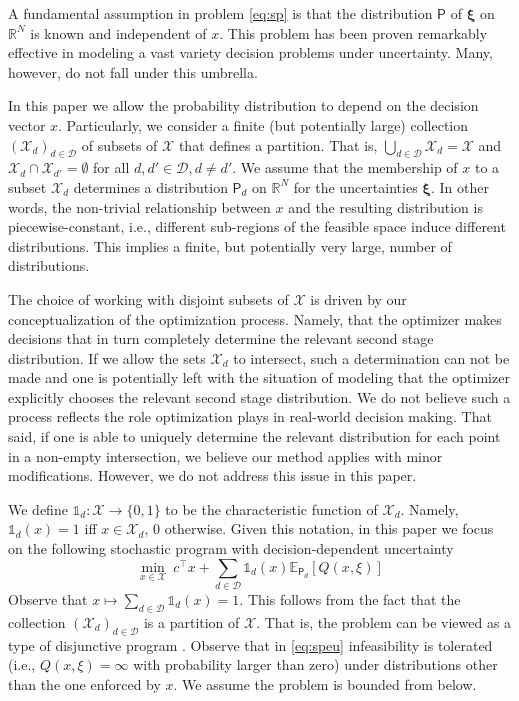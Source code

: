 \documentclass[12pt]{article}
\theoremstyle{thmstylethree}%
\newcommand{\mtc}[1] {\mathcal{#1}}
\newcommand{\pr}[1]{\ensuremath{\mathsf{#1}}}
\newcommand{\rv}[1]{\ensuremath{\bm{#1}}}
\def\R{\ensuremath{\mathbb{R}}}
\def\Ex{\ensuremath{\mathbb{E}}}
\def\Ind{\ensuremath{\mathbb{1}}}
\begin{document}
A fundamental assumption in problem \eqref{eq:sp} is that the distribution $\pr{P}$ of $\rv{\xi}$ on $\R^N$ is known and independent of $x$.
This problem has been proven remarkably effective in modeling a vast variety decision problems under uncertainty. 
Many, however, do not fall under this umbrella. 

In this paper we allow the probability distribution to depend on the decision vector $x$. 
Particularly, we consider a finite (but potentially large) collection $(\mtc{X}_d)_{d\in\mtc{D}}$ of subsets of $\mtc{X}$ that defines a partition. 
That is, $\bigcup_{d\in\mtc{D}}\mtc{X}_d=\mtc{X}$ and $\mtc{X}_{d} \cap \mtc{X}_{d'} = \emptyset$ for all $d,d' \in \mtc{D},d \neq d'$.  
We assume that the membership of $x$ to a subset $\mtc{X}_d$ determines a distribution $\pr{P}_d$ on $\R^N$ for the uncertainties $\rv{\xi}$. 
In other words, the non-trivial relationship between $x$ and the resulting distribution is piecewise-constant, i.e., different sub-regions of the feasible space induce different distributions. 
This implies a finite, but potentially very large, number of distributions. 

The choice of working with disjoint subsets of $\mtc{X}$ is driven by our conceptualization of the optimization process. Namely, that the optimizer makes decisions that in turn completely determine the relevant second stage distribution. If we allow the sets $\mtc{X}_d$ to intersect, such a determination can not be made and one is potentially left with the situation of modeling that the optimizer explicitly chooses the relevant second stage distribution. We do not believe such a process reflects the role optimization plays in real-world decision making. That said, if one is able to uniquely determine the relevant distribution for each point in a non-empty intersection, we believe our method applies with minor modifications. However, we do not address this issue in this paper. 


We define $\Ind_d:\mtc{X}\to\{0,1\}$ to be the characteristic function of $\mtc{X}_d$. Namely, $\Ind_d(x)= 1$ iff  $x\in\mtc{X}_d$, $0$ otherwise. Given this notation, in this paper we focus on the following stochastic program with decision-dependent uncertainty
\begin{equation}
     \min_{x\in \mtc{X}} ~c^\top x+\sum_{d\in\mtc{D}}\Ind_d(x)\Ex_{\pr{P}_d}[Q(x,\xi)]
     \label{eq:speu}
\end{equation}
Observe that $x\mapsto\sum_{d\in\mtc{D}}\Ind_d(x)=1$. This follows from the fact that the collection $(\mtc{X}_d)_{d\in\mtc{D}}$ is a partition of $\mtc{X}$.  That is, the problem can be viewed as a type of disjunctive program \cite{balas2018disjunctive}.  Observe that in \eqref{eq:speu} infeasibility is tolerated (i.e., $Q(x,\xi)=\infty$ with probability larger than zero) under distributions other than the one enforced by $x$. We assume the problem is bounded from below. 
\end{document}
